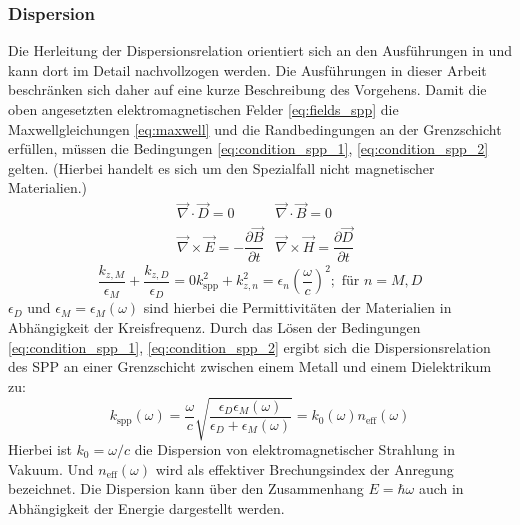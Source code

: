 \documentclass[titlepage]{article}
\begin{document}
	\subsubsection{Dispersion}
	Die Herleitung der Dispersionsrelation orientiert sich an den Ausführungen in \cite[pp.~261--ff]{Fox.2020} und kann dort im Detail nachvollzogen werden. Die Ausführungen in dieser Arbeit beschränken sich daher auf eine kurze Beschreibung des Vorgehens.
	Damit die oben angesetzten elektromagnetischen Felder \eqref{eq:fields_spp}  die Maxwellgleichungen \eqref{eq:maxwell} und die Randbedingungen an der Grenzschicht erfüllen, müssen die Bedingungen \eqref{eq:condition_spp_1},  \eqref{eq:condition_spp_2} gelten. (Hierbei handelt es sich um den Spezialfall nicht magnetischer Materialien.)
	\begin{align}
		\label{eq:maxwell}	
		&\vec{\nabla}\cdot\vec{D} = 0		&\vec{\nabla}\cdot\vec{B} = 0 \\
		&\vec{\nabla}\times\vec{E} = -\dfrac{\partial\vec{B}}{\partial t} 
		&\vec{\nabla}\times\vec{H} = 	\dfrac{\partial\vec{D}}{\partial t}\nonumber
	\end{align}
	\begin{subequations}
		\begin{equation}
			\label{eq:condition_spp_1}
			\dfrac{k_{z, M}}{\epsilon_M} + \dfrac{k_{z, D}}{\epsilon_D} = 0
		\end{equation}		
		\begin{equation}
			\label{eq:condition_spp_2}
			k_{\mathrm{spp}}^2 +k_{z, n}^2 = \epsilon_n\left(\dfrac{\omega}{c}\right)^2; \text{ für  } n=M,D
		\end{equation}
		\end{subequations}
		$\epsilon_D$ und $\epsilon_M = \epsilon_M(\omega) $ sind hierbei die Permittivitäten der Materialien in Abhängigkeit der Kreisfrequenz.
		Durch das Lösen der Bedingungen \eqref{eq:condition_spp_1},  \eqref{eq:condition_spp_2} ergibt sich die Dispersionsrelation des SPP an einer Grenzschicht zwischen einem Metall und einem Dielektrikum zu: 
		\begin{equation}
			\label{eq:dispersion_spp}
			\boxed{
				k_{\mathrm{spp}}\left(\omega\right) = \dfrac{\omega}{c} \sqrt{\dfrac{\epsilon_D\epsilon_M(\omega)}{\epsilon_D + 	\epsilon_M(\omega)}}  = k_0(\omega) n_{\mathrm{eff}}(\omega)}
		\end{equation}
		Hierbei ist $k_0 = \omega / c$ die Dispersion von elektromagnetischer Strahlung in Vakuum. Und $n_{\mathrm{eff}}(\omega)$ wird als effektiver Brechungsindex der Anregung bezeichnet. Die Dispersion kann über den Zusammenhang $E = \hbar \omega$ auch in Abhängigkeit der Energie dargestellt werden.
		
\end{document}
